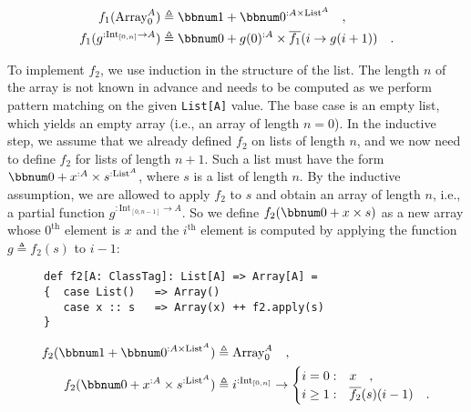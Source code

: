\noindent \vspace{-1.25\baselineskip}
\begin{align*}
f_{1}(\text{Array}_{0}^{A}) & \triangleq\bbnum 1+\bbnum 0^{:A\times\text{List}^{A}}\quad,\\
f_{1}(g^{:\text{Int}_{[0,n]}\rightarrow A}) & \triangleq\bbnum 0+g(0)^{:A}\times\overline{f_{1}}(i\rightarrow g(i+1))\quad.
\end{align*}
\vspace{-0.5\baselineskip}

To implement $f_{2}$, we use induction in the structure of the list.
The length $n$ of the array is not known in advance and needs to
be computed as we perform pattern matching on the given \lstinline!List[A]!
value. The base case is an empty list, which yields an empty array
(i.e., an array of length $n=0$). In the inductive step, we assume
that we already defined $f_{2}$ on lists of length $n$, and we now
need to define $f_{2}$ for lists of length $n+1$. Such a list must
have the form $\bbnum 0+x^{:A}\times s^{:\text{List}^{A}}$, where
$s$ is a list of length $n$. By the inductive assumption, we are
allowed to apply $f_{2}$ to $s$ and obtain an array of length $n$,
i.e., a partial function $g^{:\text{Int}_{[0,n-1]}\rightarrow A}$.
So we define $f_{2}(\bbnum 0+x\times s)$ as a new array whose $0^{\text{th}}$
element is $x$ and the $i^{\text{th}}$ element is computed by applying
the function $g\triangleq f_{2}(s)$ to $i-1$:

\begin{wrapfigure}{l}{0.4363\columnwidth}%
\vspace{-0.75\baselineskip}
\begin{lstlisting}
def f2[A: ClassTag]: List[A] => Array[A] =
{  case List()   => Array()
   case x :: s   => Array(x) ++ f2.apply(s)
}
\end{lstlisting}

\vspace{-1.25\baselineskip}
\end{wrapfigure}%

\noindent \vspace{-1.25\baselineskip}
\begin{align*}
f_{2}(\bbnum 1+\bbnum 0^{:A\times\text{List}^{A}}) & \triangleq\text{Array}_{0}^{A}\quad,\\
f_{2}(\bbnum 0+x^{:A}\times s^{:\text{List}^{A}}) & \triangleq i^{:\text{Int}_{[0,n]}}\rightarrow\begin{cases}
i=0: & x\quad,\\
i\geq1: & \overline{f_{2}}(s)(i-1)\quad.
\end{cases}
\end{align*}
\vspace{-0.5\baselineskip}

